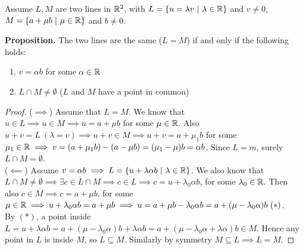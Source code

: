 \noindent Assume $L, M$ are two lines in $\mathbb{R}^2$, with $L = \{ u = \lambda v ~|~ \lambda \in \mathbb{R}\}$ and $v \neq 0$, $M = \{a + \mu b ~|~ \mu \in \mathbb{R}\}$ and $b \neq 0$.

\pagebreak

\noindent \textbf{Proposition.} The two lines are the same ($L = M$) if and only if the following holds:\begin{enumerate}
\item $v = \alpha b$ for some $\alpha \in \mathbb{R}$
\item $L \cap M \neq \emptyset$ ($L$ and $M$ have a point in common) 	
\end{enumerate}
\begin{proof}
($\implies$) Assume that $L= M$. We know that $u \in L \implies u \in M \implies u = a + \mu b$ for some $\mu \in \mathbb{R}$. Also $u + v = L ~(\lambda = v) \implies u + v \in M \implies u + v = a + \mu_1b$ for some $\mu_1 \in \mathbb{R} \implies v = (a+\mu _1b) - (a-\mu b) = (\mu _1 - \mu )b = \alpha b$. Since $L=m$, surely $L \cap M = \emptyset$.\\

($\impliedby$) Assume $v = \alpha b \implies L = \{u + \lambda \alpha b ~|~ \lambda \in \mathbb{R}\}$. We also know that $L \cap M \neq \emptyset \implies \exists c \in L \cap M \implies c \in L \implies c = u + \lambda_0\alpha b$, for some $\lambda_0 \in \mathbb{R}.$ Then also $c \in M \implies c = a + \mu b$, for some $\mu \in \mathbb{R} \implies u + \lambda_0 \alpha b = a + \mu b \implies u = a + \mu b - \lambda_0\alpha b = a + (\mu - \lambda_0\alpha)b ~(*)$. \\

By $(*)$, a point inside $L = u + \lambda \alpha b = a + (\mu - \lambda_0 \alpha) b + \lambda \alpha b = a + (\mu - \lambda_0 \alpha  + \lambda \alpha)b \in M$. Hence any point in $L$ is inside $M$, so $L \subseteq M$. Similarly by symmetry $M \subseteq L \implies L = M$.
\end{proof}

